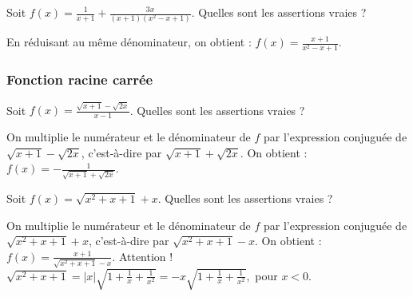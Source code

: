 \begin{question} 
Soit $f(x)= \frac{1}{x+1}+ \frac{3x}{(x+1)(x^2-x+1)}$. Quelles sont les assertions vraies ?
\begin{answers}
    


\end{answers}
\begin{explanations}
En réduisant au même dénominateur, on obtient :  $f(x)= \frac{x+1}{x^2-x+1}$. 
\end{explanations}

\end{question}

\subsubsection{Fonction racine carrée}

\begin{question} 
Soit $f(x)= \frac{\sqrt {x+1}-\sqrt {2x}}{x-1}$. Quelles sont les assertions vraies ?
\begin{answers}
    


\end{answers}
\begin{explanations}
On multiplie le numérateur et le dénominateur de $f$ par l'expression conjuguée de $\sqrt {x+1}-\sqrt {2x}$, c'est-à-dire par  $\sqrt {x+1}+\sqrt {2x}$. On obtient : 
$f(x)= -\frac{1}{\sqrt {x+1}+\sqrt {2x}}$.
\end{explanations}

\end{question}


\begin{question} 
Soit $f(x)= \sqrt{x^2+x+1}+x$. Quelles sont les assertions vraies ?
\begin{answers}
    


\end{answers}
\begin{explanations}
On multiplie le numérateur et le dénominateur de $f$ par l'expression conjuguée de $\sqrt{x^2+x+1}+x$, c'est-à-dire par  $\sqrt{x^2+x+1}-x$. On obtient : 
$f(x)= \frac{x+1}{\sqrt {x^2+x+1}-x}$. Attention !  $\sqrt {x^2+x+1}=|x|\sqrt {1+\frac{1}{x}+ \frac{1}{x^2}}= -x\sqrt {1+\frac{1}{x}+ \frac{1}{x^2}}, $ pour $x<0$.
\end{explanations}

\end{question}



